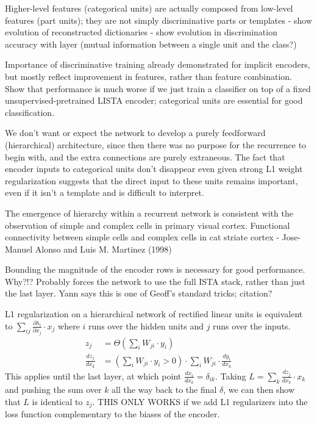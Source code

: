 Higher-level features (categorical units) are actually composed from low-level features (part units); they are not simply discriminative parts or templates
  - show evolution of reconstructed dictionaries
  - show evolution in discrimination accuracy with layer (mutual information between a single unit and the class?)

Importance of discriminative training already demonstrated for implicit encoders, but mostly reflect improvement in features, rather than feature combination.  Show that performance is much worse if we just train a classifier on top of a fixed unsupervised-pretrained LISTA encoder; categorical units are essential for good classification.  
 
We don't want or expect the network to develop a purely feedforward (hierarchical) architecture, since then there was no purpose for the recurrence to begin with, and the extra connections are purely extraneous.  The fact that encoder inputs to categorical units don't disappear even given strong L1 weight regularization suggests that the direct input to these units remains important, even if it isn't a template and is difficult to interpret.


The emergence of hierarchy within a recurrent network is consistent with the observation of simple and complex cells in primary visual cortex.  
Functional connectivity between simple cells and complex cells in cat striate cortex - Jose-Manuel Alonso and Luis M. Martinez (1998)

Bounding the magnitude of the encoder rows is necessary for good performance.  Why?!?  Probably forces the network to use the full ISTA stack, rather than just the last layer.  Yann says this is one of Geoff's standard tricks; citation?

L1 regularization on a hierarchical network of rectified linear units is equivalent to $\sum_{ij} \frac{\partial h_i}{\partial x_j} \cdot x_j$ where $i$ runs over the hidden units and $j$ runs over the inputs.  
\begin{align*}
z_j &= \Theta\left(\sum_i W_{ji} \cdot y_i \right) \\
\frac{d z_j}{d x_k} &= \left( \sum_i W_{ji} \cdot y_i > 0 \right) \cdot \sum_i W_{ji} \cdot \frac{d y_i}{d x_k} 
\end{align*}
This applies until the last layer, at which point $\frac{d x_i}{d x_k} = \delta_{ik}$.  Taking $L = \sum_k \frac{d z_j}{d x_k} \cdot x_k$ and pushing the sum over $k$ all the way back to the final $\delta$, we can then show that $L$ is identical to $z_j$.  THIS ONLY WORKS if we add L1 regularizers into the loss function complementary to the biases of the encoder.

